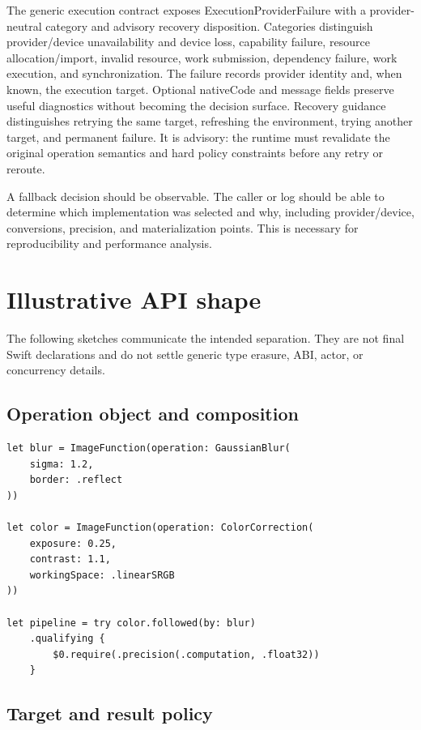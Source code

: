 \documentclass[11pt,a4paper,oneside]{article}
\begin{document}
The generic execution contract exposes ExecutionProviderFailure with a provider-neutral category and advisory recovery disposition. Categories distinguish provider/device unavailability and device loss, capability failure, resource allocation/import, invalid resource, work submission, dependency failure, work execution, and synchronization. The failure records provider identity and, when known, the execution target. Optional nativeCode and message fields preserve useful diagnostics without becoming the decision surface. Recovery guidance distinguishes retrying the same target, refreshing the environment, trying another target, and permanent failure. It is advisory: the runtime must revalidate the original operation semantics and hard policy constraints before any retry or reroute.

A fallback decision should be observable. The caller or log should be able to determine which implementation was selected and why, including provider/device, conversions, precision, and materialization points. This is necessary for reproducibility and performance analysis.

\section{Illustrative API shape}

The following sketches communicate the intended separation. They are not final Swift declarations and do not settle generic type erasure, ABI, actor, or concurrency details.

\subsection{Operation object and composition}

\begin{lstlisting}
let blur = ImageFunction(operation: GaussianBlur(
    sigma: 1.2,
    border: .reflect
))

let color = ImageFunction(operation: ColorCorrection(
    exposure: 0.25,
    contrast: 1.1,
    workingSpace: .linearSRGB
))

let pipeline = try color.followed(by: blur)
    .qualifying {
        $0.require(.precision(.computation, .float32))
    }
\end{lstlisting}

\subsection{Target and result policy}
\end{document}
